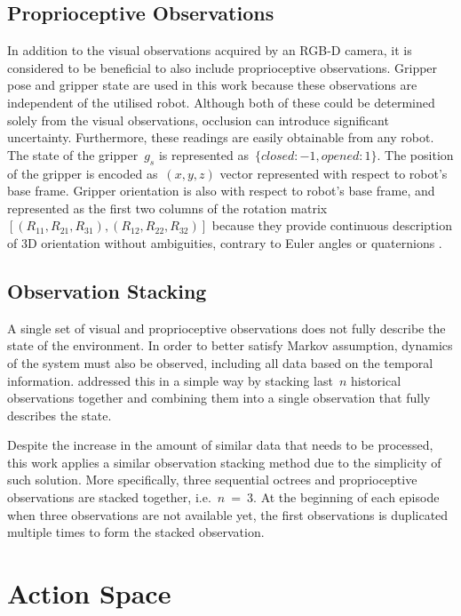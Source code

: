 \subsection{Proprioceptive Observations}\label{subsec:problem_formulation_proprioceptive_observations}

In addition to the visual observations acquired by an RGB-D camera, it is considered to be beneficial to also include proprioceptive observations. Gripper pose and gripper state are used in this work because these observations are independent of the utilised robot. Although both of these could be determined solely from the visual observations, occlusion can introduce significant uncertainty. Furthermore, these readings are easily obtainable from any robot. The state of the gripper~\(g_{s}\) is represented as~\(\{closed: -1, opened: 1\}\). The position of the gripper is encoded as~\((x,y,z)\) vector represented with respect to robot's base frame. Gripper orientation is also with respect to robot's base frame, and represented as the first two columns of the rotation matrix~\([(R_{11},R_{21},R_{31}),(R_{12},R_{22},R_{32})]\) because they provide continuous description of 3D orientation without ambiguities, contrary to Euler angles or quaternions \cite{zhou_continuity_2020}.


\subsection{Observation Stacking}\label{subsec:observation_stacking}

A single set of visual and proprioceptive observations does not fully describe the state of the environment. In order to better satisfy Markov assumption, dynamics of the system must also be observed, including all data based on the temporal information. \citet{mnih_human-level_2015} addressed this in a simple way by stacking last~\(n\) historical observations together and combining them into a single observation that fully describes the state.

Despite the increase in the amount of similar data that needs to be processed, this work applies a similar observation stacking method due to the simplicity of such solution. More specifically, three sequential octrees and proprioceptive observations are stacked together, i.e.~\(n\)~=~\(3\). At the beginning of each episode when three observations are not available yet, the first observations is duplicated multiple times to form the stacked observation.


\section{Action Space}

